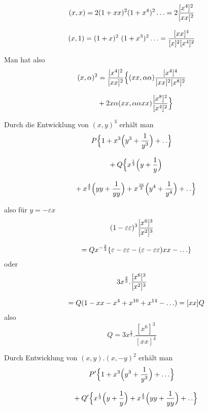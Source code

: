 \begingroup
\renewcommand{\arraystretch}{1.45}


\[
\begin{gathered}
(x,x)=2(1+xx)^2(1+x^4)^2\mathinner{.\,.\,.}
       =2\frac{[x^4]^2}{[xx]^2}\\[8pt]
(x,1)=(1+x)^2\ (1+x^3)^2\mathinner{.\,.\,.}
       =\frac{[xx]^4}{[x]^2[x^4]^2}
\end{gathered}
\]

Man hat also
\[
\begin{gathered}(x,\alpha)^2=\frac{[x^4]^2}{[xx]^2}
\Bigl\{(xx,\alpha\alpha)\frac{[x^4]^4}{[xx]^2[x^8]^2}
\\[8pt]\quad{}+2x\alpha(xx,\alpha\alpha xx)\frac{[x^8]^2}{[x^4]^2}\Bigr\}\end{gathered}
\]


Durch die Entwicklung von $(x,y)^3$ erhält man
\[
\begin{gathered}P\Bigl\{1+x^3\Bigl(y^3+\frac{1}{y^3}\Bigr)+.\,.\Bigr\}
\\[8pt]\quad{}+Q\Bigl\{x^{\frac13}\Bigl(y+\frac1y\Bigr)
\\[8pt]\quad{}+x^{\frac43}\Bigl(yy+\frac1{yy}\Bigr)
+x^{\frac{16}3}\Bigl(y^4+\frac1{y^4}\Bigr)+.\,.\Bigr\}\end{gathered}
\]

also für $y=-\varepsilon x$
\[
\begin{gathered}(1-\varepsilon\varepsilon)^3\frac{[x^6]^3}{[x^2]^3}
\\[8pt]\quad{}=Qx^{-\frac23}\{\varepsilon-\varepsilon\varepsilon
-(\varepsilon-\varepsilon\varepsilon)xx-\mathinner{.\,.\,.}\}\end{gathered}
\]
oder
\[
\begin{gathered}3x^{\frac23}.\frac{[x^6]^3}{[x^2]^3}
\\[8pt]\quad{}=Q(1-xx-x^4+x^{10}+x^{14}-\mathinner{.\,.\,.})=[xx]Q\end{gathered}
\]
also
\[
Q=3x^{\frac23}.\frac{[x^6]^3}{[xx]^4}
\]


Durch Entwicklung von $(x,y).(x,-y)^2$ erhält man
\[
\begin{gathered}P'\Bigl\{1+x^3\Bigl(y^3+\frac1{y^3}\Bigr)+\mathinner{.\,.\,.}\Bigr\}
\\[8pt]\quad{}+Q'\Bigl\{x^{\frac13}\Bigl(y+\frac1y\Bigr)
+x^{\frac43}\Bigl(yy+\frac1{yy}\Bigr)+.\,.\Bigr\}\end{gathered}
\]

